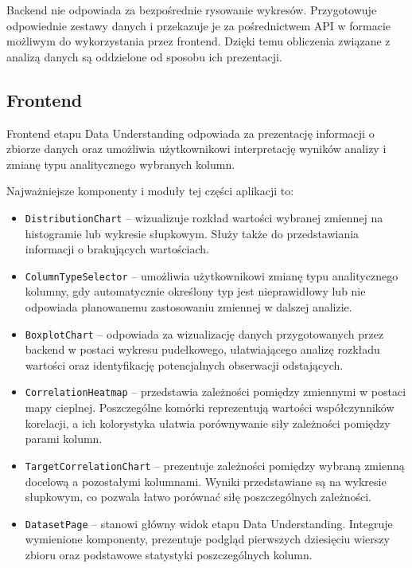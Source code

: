 \documentclass[12pt]{book}
\begin{document}
Backend nie odpowiada za bezpośrednie rysowanie wykresów.
Przygotowuje odpowiednie zestawy danych i przekazuje je
za pośrednictwem API w formacie możliwym do wykorzystania
przez frontend. Dzięki temu obliczenia związane z analizą
danych są oddzielone od sposobu ich prezentacji.

\subsection{Frontend}

Frontend etapu Data Understanding odpowiada za prezentację
informacji o zbiorze danych oraz umożliwia użytkownikowi
interpretację wyników analizy i zmianę typu analitycznego
wybranych kolumn.

Najważniejsze komponenty i moduły tej części aplikacji to:

\begin{itemize}
	\item \texttt{DistributionChart} -- wizualizuje rozkład
    wartości wybranej zmiennej na histogramie lub wykresie słupkowym.
    Służy także do przedstawiania informacji o brakujących wartościach.

	\item \texttt{ColumnTypeSelector} -- umożliwia użytkownikowi
    zmianę typu analitycznego kolumny, gdy automatycznie
    określony typ jest nieprawidłowy lub nie odpowiada
    planowanemu zastosowaniu zmiennej w dalszej analizie.

	\item \texttt{BoxplotChart} -- odpowiada za wizualizację
    danych przygotowanych przez backend w postaci wykresu
    pudełkowego, ułatwiającego analizę rozkładu wartości
    oraz identyfikację potencjalnych obserwacji odstających.

	\item \texttt{CorrelationHeatmap} -- przedstawia zależności
	pomiędzy zmiennymi w postaci mapy cieplnej.	Poszczególne komórki
	reprezentują wartości współczynników korelacji,
	a ich kolorystyka ułatwia porównywanie siły zależności 
	pomiędzy parami kolumn.

	\item \texttt{TargetCorrelationChart} -- prezentuje zależności
	pomiędzy wybraną zmienną docelową a pozostałymi kolumnami.
	Wyniki przedstawiane są na wykresie słupkowym,
	co pozwala łatwo porównać siłę poszczególnych zależności.

    \item \texttt{DatasetPage} -- stanowi główny widok etapu
    Data Understanding. Integruje wymienione komponenty,
    prezentuje podgląd pierwszych dziesięciu wierszy zbioru
    oraz podstawowe statystyki poszczególnych kolumn.
\end{itemize}
\end{document}
